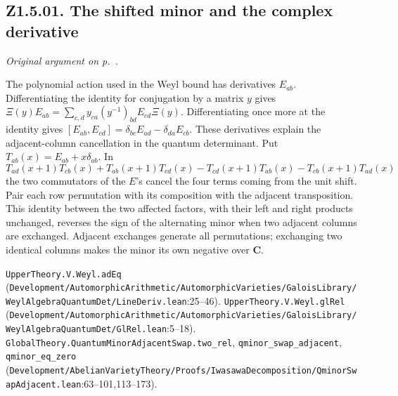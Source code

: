 \subsection{Z1.5.01. The shifted minor and the complex derivative}\label{r6:review:Z1.5.01} \emph{Original argument on p.~\pageref{r5:small:Z1.5.01}.} 

The polynomial action used in the Weyl bound has derivatives $E_{ab}$. Differentiating the identity for conjugation by a matrix $y$ gives
$\Xi(y)E_{ab}=\sum_{c,d}y_{ca}(y^{-1})_{bd}E_{cd}\Xi(y)$. Differentiating once more at the identity gives $[E_{ab},E_{cd}]=\delta_{bc}E_{ad}-\delta_{da}E_{cb}$. These derivatives explain the adjacent-column cancellation in the quantum determinant. Put $T_{ab}(x)=E_{ab}+x\delta_{ab}$. In
\[
T_{ad}(x+1)T_{cb}(x)+T_{ab}(x+1)T_{cd}(x)
-T_{cd}(x+1)T_{ab}(x)-T_{cb}(x+1)T_{ad}(x)
\]
the two commutators of the $E$'s cancel the four terms coming from the unit shift. Pair each row permutation with its composition with the adjacent transposition. This identity between the two affected factors, with their left and right products unchanged, reverses the sign of the alternating minor when two adjacent columns are exchanged. Adjacent exchanges generate all permutations; exchanging two identical columns makes the minor its own negative over $\mathbf C$.
\par{\footnotesize \nolinkurl{UpperTheory.V.Weyl.adEq} (\nolinkurl{Development/AutomorphicArithmetic/AutomorphicVarieties/GaloisLibrary/WeylAlgebraQuantumDet/LineDeriv.lean}\allowbreak:25--46). \nolinkurl{UpperTheory.V.Weyl.glRel} (\nolinkurl{Development/AutomorphicArithmetic/AutomorphicVarieties/GaloisLibrary/WeylAlgebraQuantumDet/GlRel.lean}\allowbreak:5--18). \nolinkurl{GlobalTheory.QuantumMinorAdjacentSwap.two_rel}, \nolinkurl{qminor_swap_adjacent}, \nolinkurl{qminor_eq_zero} (\nolinkurl{Development/AbelianVarietyTheory/Proofs/IwasawaDecomposition/QminorSwapAdjacent.lean}\allowbreak:63--101,113--173).\par}

